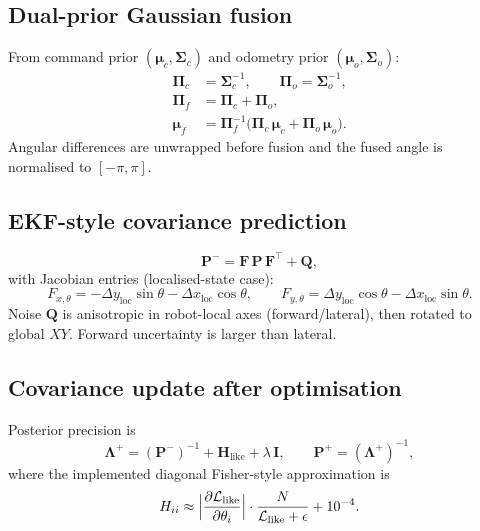 \documentclass[a4paper, 11pt]{article}
\newcommand{\vect}[1]{\bm{#1}}
\newcommand{\mat}[1]{\bm{#1}}
\begin{document}
\subsection{Dual-prior Gaussian fusion}

From command prior $(\vect{\mu}_c, \mat{\Sigma}_c)$ and odometry prior
$(\vect{\mu}_o, \mat{\Sigma}_o)$:
\begin{equation}\label{eq:gaussian-fusion}
\begin{aligned}
  \mat{\Pi}_c &= \mat{\Sigma}_c^{-1}, \qquad
  \mat{\Pi}_o = \mat{\Sigma}_o^{-1}, \\
  \mat{\Pi}_f &= \mat{\Pi}_c + \mat{\Pi}_o, \\
  \vect{\mu}_f &= \mat{\Pi}_f^{-1}\bigl(
    \mat{\Pi}_c\,\vect{\mu}_c + \mat{\Pi}_o\,\vect{\mu}_o
  \bigr).
\end{aligned}
\end{equation}
Angular differences are unwrapped before fusion and the fused angle is
normalised to $[-\pi, \pi]$.

\subsection{EKF-style covariance prediction}

\begin{equation}\label{eq:cov-pred}
  \mat{P}^{-} = \mat{F}\,\mat{P}\,\mat{F}^\top + \mat{Q},
\end{equation}
with Jacobian entries (localised-state case):
\begin{equation}
  F_{x,\theta} = -\Delta y_{\text{loc}}\sin\theta - \Delta x_{\text{loc}}\cos\theta,
  \qquad
  F_{y,\theta} =  \Delta y_{\text{loc}}\cos\theta - \Delta x_{\text{loc}}\sin\theta.
\end{equation}
Noise $\mat{Q}$ is anisotropic in robot-local axes (forward/lateral), then
rotated to global $XY$.  Forward uncertainty is larger than lateral.

\subsection{Covariance update after optimisation}

Posterior precision is
\begin{equation}\label{eq:cov-update}
  \mat{\Lambda}^{+}
  = (\mat{P}^{-})^{-1} + \mat{H}_{\text{like}} + \lambda\,\mat{I},
  \qquad
  \mat{P}^{+} = (\mat{\Lambda}^{+})^{-1},
\end{equation}
where the implemented diagonal Fisher-style approximation is
\begin{equation}
  H_{ii}
  \approx
  \Bigl|\frac{\partial\mathcal{L}_{\text{like}}}{\partial\theta_i}\Bigr|
  \cdot \frac{N}{\mathcal{L}_{\text{like}} + \epsilon}
  + 10^{-4}.
\end{equation}
\end{document}
